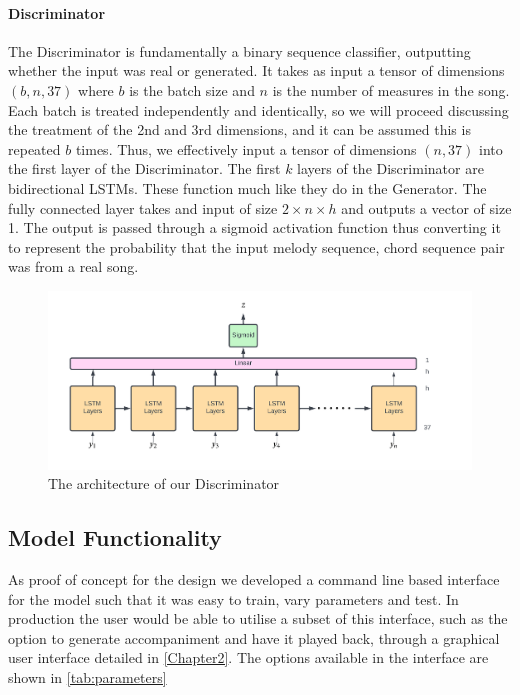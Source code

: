 \paragraph{Discriminator}
The Discriminator is fundamentally a binary sequence classifier, outputting whether the input was real or generated.
It takes as input a tensor of dimensions $(b,n,37)$ where $b$ is the batch size and $n$ is the number of measures in the song.
Each batch is treated independently and identically, so we will proceed discussing the treatment of the 2nd and 3rd dimensions, and it can be assumed this is repeated $b$ times.
Thus, we effectively input a tensor of dimensions $(n,37)$ into the first layer of the Discriminator.
The first $k$ layers of the Discriminator are bidirectional LSTMs. 
These function much like they do in the Generator.
The fully connected layer takes and input of size $2 \times n \times h$ and outputs a vector of size 1.
The output is passed through a sigmoid activation function thus converting it to represent the probability that the input melody sequence, chord sequence pair was from a real song.

\begin{figure}
    \centering
    \includegraphics[width=0.8\columnwidth]{Figures/Discriminator}
    \decoRule
    \caption{The architecture of our Discriminator}
    \label{fig:Discriminator}
\end{figure}


\subsection{Model Functionality}

As proof of concept for the design we developed a command line based interface for the model such that it was easy to train, vary parameters and test. 
In production the user would be able to utilise a subset of this interface, such as the option to generate accompaniment and have it played back, through a graphical user interface detailed in \cref{Chapter2}.
The options available in the interface are shown in \cref{tab:parameters}

